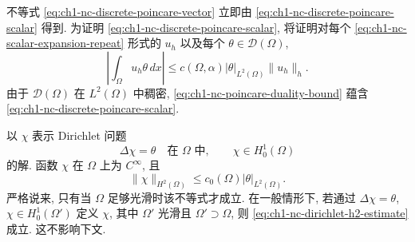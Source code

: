 \begin{Proof}
不等式 \eqref{eq:ch1-nc-discrete-poincare-vector} 立即由 \eqref{eq:ch1-nc-discrete-poincare-scalar} 得到. 为证明 \eqref{eq:ch1-nc-discrete-poincare-scalar}, 将证明对每个 \eqref{eq:ch1-nc-scalar-expansion-repeat} 形式的 $u_h$ 以及每个 $\theta\in\mathcal D(\Omega)$,
\begin{equation}
\left|\int_\Omega u_h\theta\,dx\right|
\leq c(\Omega,\alpha)|\theta|_{L^2(\Omega)}\|u_h\|_h.
\label{eq:ch1-nc-poincare-duality-bound}
\end{equation}
由于 $\mathcal D(\Omega)$ 在 $L^2(\Omega)$ 中稠密, \eqref{eq:ch1-nc-poincare-duality-bound} 蕴含 \eqref{eq:ch1-nc-discrete-poincare-scalar}.

以 $\chi$ 表示 Dirichlet 问题
\[
\Delta\chi=\theta\quad\text{在 }\Omega\text{ 中},
\qquad\chi\in H_0^1(\Omega)
\]
的解. 函数 $\chi$ 在 $\Omega$ 上为 $C^\infty$, 且
\begin{equation}
\|\chi\|_{H^2(\Omega)}\leq c_0(\Omega)|\theta|_{L^2(\Omega)}.
\label{eq:ch1-nc-dirichlet-h2-estimate}
\end{equation}
严格说来, 只有当 $\Omega$ 足够光滑时该不等式才成立. 在一般情形下, 若通过 $\Delta\chi=\theta$, $\chi\in H_0^1(\Omega')$ 定义 $\chi$, 其中 $\Omega'$ 光滑且 $\Omega'\supset\Omega$, 则 \eqref{eq:ch1-nc-dirichlet-h2-estimate} 成立. 这不影响下文.


\end{Proof}
